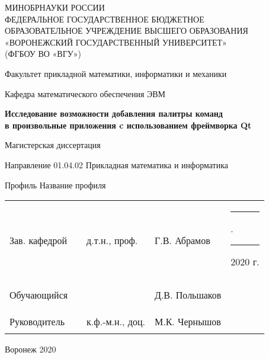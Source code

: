 \newcommand{\disserDepartment}{математического обеспечения ЭВМ}
\newcommand{\disserProgram}{01.04.02 Прикладная математика и информатика}
\newcommand{\disserTitle}{Исследование возможности добавления палитры команд \\
в произвольные приложения c использованием фреймворка Qt}
\newcommand{\disserProfile}{Название профиля}

\newcommand{\disserHeadOfDepStatus}{д.т.н., проф.}
\newcommand{\disserHeadOfDepName}{Г.В. Абрамов}
\newcommand{\disserStudent}{Д.В. Польшаков}

\newcommand{\disserSupervisorStatus}{к.ф.-м.н., доц.}
\newcommand{\disserSupervisorName}{М.К. Чернышов}

\thispagestyle{empty}
\begin{center}
МИНОБРНАУКИ РОССИИ \\
ФЕДЕРАЛЬНОЕ ГОСУДАРСТВЕННОЕ БЮДЖЕТНОЕ \\
ОБРАЗОВАТЕЛЬНОЕ УЧРЕЖДЕНИЕ ВЫСШЕГО ОБРАЗОВАНИЯ \\
«ВОРОНЕЖСКИЙ ГОСУДАРСТВЕННЫЙ УНИВЕРСИТЕТ» \\
(ФГБОУ ВО «ВГУ»)

\vspace{2ex}

Факультет прикладной математики, информатики и механики

\vspace{2ex}

Кафедра \disserDepartment{}

\vspace{3.5cm}
\textbf{\disserTitle}

\vspace{1cm}
Магистерская диссертация

\vspace{0.5cm}
Направление \disserProgram{}

\vspace{0.5cm}
Профиль \disserProfile{}

\vspace{4cm}

\begin{center}
  \begin{tabular}{ l l l l l }
    Зав. кафедрой & \rule{25mm}{0.1mm} & \disserHeadOfDepStatus{}  & \disserHeadOfDepName{} & \rule{7mm}{0.1mm}.\rule{7mm}{0.1mm} 2020 г.  \\
    & \\
    Обучающийся   & \rule{25mm}{0.1mm} &                           & \disserStudent{} & \\
    & \\
    Руководитель  & \rule{25mm}{0.1mm} & \disserSupervisorStatus{} & \disserSupervisorName{} & \\
  \end{tabular}
\end{center}

\vspace{3cm}
Воронеж 2020
\end{center}
